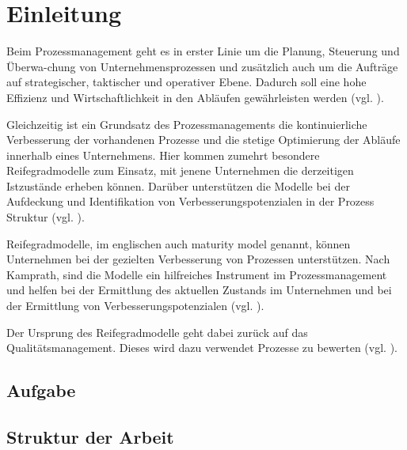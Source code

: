 \newpage
\fancyhead[L]{\textcolor{lightgrey}{\nouppercase{\rightmark}}}

\section{Einleitung}

Beim Prozessmanagement geht es in erster Linie um die Planung, Steuerung und Überwa-chung von Unternehmensprozessen und zusätzlich auch um die
Aufträge auf strategischer, taktischer und operativer Ebene. Dadurch soll eine hohe Effizienz und Wirtschaftlichkeit in den Abläufen gewährleisten
werden (vgl. \cite[S.5]{Schmidt2012}). \par

Gleichzeitig ist ein Grundsatz des Prozessmanagements die kontinuierliche Verbesserung der vorhandenen Prozesse und die stetige Optimierung der Abläufe
innerhalb eines Unternehmens. Hier kommen zumehrt besondere Reifegradmodelle zum Einsatz, mit jenene Unternehmen die derzeitigen Istzustände erheben können. Darüber
unterstützen die Modelle bei der Aufdeckung und Identifikation von Verbesserungspotenzialen in der Prozess Struktur (vgl. \cite[S.1]{Kamprath2011}). \par

Reifegradmodelle, im englischen auch \glqq maturity model\grqq{} genannt, können Unternehmen bei der gezielten Verbesserung von Prozessen unterstützen. Nach Kamprath, sind
die Modelle ein hilfreiches Instrument im Prozessmanagement und helfen bei der Ermittlung des aktuellen Zustands im Unternehmen und bei der Ermittlung von Verbesserungspotenzialen (vgl. \cite[S.1]{Kamprath2011}). \par

Der Ursprung des Reifegradmodelle geht dabei zurück auf das Qualitätsmanagement. Dieses wird dazu verwendet Prozesse zu
bewerten (vgl. \cite[S.8]{Durr2008}).

\subsection{Aufgabe}
\subsection{Struktur der Arbeit}